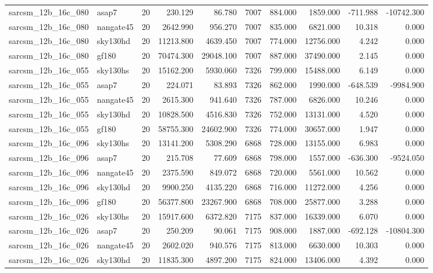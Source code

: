 \begin{longtable}{llrrrrrrrr}
sarcsm\_12b\_16c\_080 & asap7 & 20 & 230.129 & 86.780 & 7007 & 884.000 & 1859.000 & -711.988 & -10742.300 \\
sarcsm\_12b\_16c\_080 & nangate45 & 20 & 2642.990 & 956.270 & 7007 & 835.000 & 6821.000 & 10.318 & 0.000 \\
sarcsm\_12b\_16c\_080 & sky130hd & 20 & 11213.800 & 4639.450 & 7007 & 774.000 & 12756.000 & 4.242 & 0.000 \\
sarcsm\_12b\_16c\_080 & gf180 & 20 & 70474.300 & 29048.100 & 7007 & 887.000 & 37490.000 & 2.145 & 0.000 \\
sarcsm\_12b\_16c\_055 & sky130hs & 20 & 15162.200 & 5930.060 & 7326 & 799.000 & 15488.000 & 6.149 & 0.000 \\
sarcsm\_12b\_16c\_055 & asap7 & 20 & 224.071 & 83.893 & 7326 & 862.000 & 1990.000 & -648.539 & -9984.900 \\
sarcsm\_12b\_16c\_055 & nangate45 & 20 & 2615.300 & 941.640 & 7326 & 787.000 & 6826.000 & 10.246 & 0.000 \\
sarcsm\_12b\_16c\_055 & sky130hd & 20 & 10828.500 & 4516.830 & 7326 & 752.000 & 13131.000 & 4.520 & 0.000 \\
sarcsm\_12b\_16c\_055 & gf180 & 20 & 58755.300 & 24602.900 & 7326 & 774.000 & 30657.000 & 1.947 & 0.000 \\
sarcsm\_12b\_16c\_096 & sky130hs & 20 & 13141.200 & 5308.290 & 6868 & 728.000 & 13155.000 & 6.983 & 0.000 \\
sarcsm\_12b\_16c\_096 & asap7 & 20 & 215.708 & 77.609 & 6868 & 798.000 & 1557.000 & -636.300 & -9524.050 \\
sarcsm\_12b\_16c\_096 & nangate45 & 20 & 2375.590 & 849.072 & 6868 & 720.000 & 5561.000 & 10.562 & 0.000 \\
sarcsm\_12b\_16c\_096 & sky130hd & 20 & 9900.250 & 4135.220 & 6868 & 716.000 & 11272.000 & 4.256 & 0.000 \\
sarcsm\_12b\_16c\_096 & gf180 & 20 & 56377.800 & 23267.900 & 6868 & 708.000 & 25877.000 & 3.288 & 0.000 \\
sarcsm\_12b\_16c\_026 & sky130hs & 20 & 15917.600 & 6372.820 & 7175 & 837.000 & 16339.000 & 6.070 & 0.000 \\
sarcsm\_12b\_16c\_026 & asap7 & 20 & 250.209 & 90.061 & 7175 & 908.000 & 1887.000 & -692.128 & -10804.300 \\
sarcsm\_12b\_16c\_026 & nangate45 & 20 & 2602.020 & 940.576 & 7175 & 813.000 & 6630.000 & 10.303 & 0.000 \\
sarcsm\_12b\_16c\_026 & sky130hd & 20 & 11835.300 & 4897.200 & 7175 & 824.000 & 13406.000 & 4.392 & 0.000 \\

\end{longtable}
